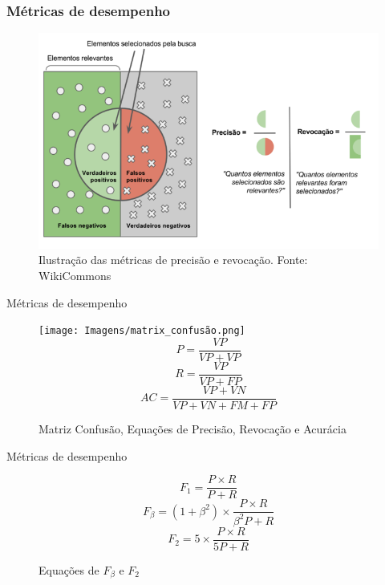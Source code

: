 \documentclass{beamer}
\begin{document}
\begin{frame}
        \frametitle{Métricas de desempenho}
        \begin{figure}[!ht]
            \centering
                \includegraphics[width=0.7\columnwidth]{Imagens/Precisão_e_revocação_cropped.png}
            \caption{Ilustração das métricas de precisão e revocação. Fonte: WikiCommons}         
        \end{figure}
\end{frame}  


\begin{frame}{Métricas de desempenho}
    \begin{figure}[!ht]
        \centering
            \texttt{[image: Imagens/matrix\_confusão.png]}
            \begin{equation} P = \frac{VP}{VP + VP} \end{equation}
            \begin{equation}R = \frac{VP}{VP + FP}\end{equation}
            \begin{equation}AC = \frac{VP + VN}{VP + VN + FM + FP}\end{equation}
        \caption{Matriz Confusão, Equações de Precisão, Revocação e Acurácia}         
        \label{fig:metricas}
    \end{figure}
\end{frame}

\begin{frame}{Métricas de desempenho}
    \begin{figure}[!ht]
        \centering
        \begin{equation}F_1 = \frac {P \times R}{P + R}\end{equation}
            \begin{equation}F_\beta = (1+\beta^2) \times \frac {P \times R}{\beta^2 P + R}\end{equation}
            \begin{equation}F_2 = 5 \times \frac {P \times R}{5 P + R}\end{equation}    
        \caption{Equações de $F_\beta$ e $F_2$}         
        \label{fig:metricas}
    \end{figure}
\end{frame}  
\end{document}
